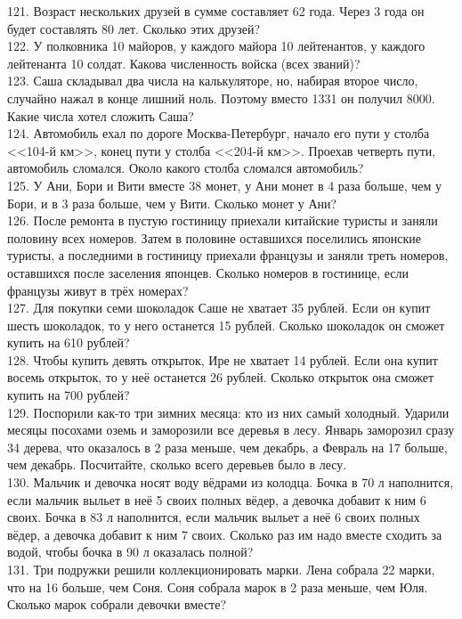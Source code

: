 \documentclass[12pt]{article}
\begin{document}
121. Возраст нескольких друзей в сумме составляет 62 года. Через 3 года он будет составлять 80 лет. Сколько этих друзей?\\
122. У полковника 10 майоров, у каждого майора 10 лейтенантов, у каждого лейтенанта 10 солдат. Какова численность войска (всех званий)?\\
123. Саша складывал два числа на калькуляторе, но, набирая второе число, случайно нажал в конце лишний ноль. Поэтому вместо 1331 он получил 8000. Какие числа хотел сложить Саша?\\
124. Автомобиль ехал по дороге Москва-Петербург, начало его пути у столба <<104-й км>>, конец пути у столба <<204-й км>>. Проехав четверть пути, автомобиль сломался. Около какого столба сломался автомобиль?\\
125. У Ани, Бори и Вити вместе 38 монет, у Ани монет в 4 раза больше, чем у Бори, и в 3 раза больше, чем у Вити. Сколько монет у Ани?\\
126. После ремонта в пустую гостиницу приехали китайские туристы и заняли половину всех номеров. Затем в половине оставшихся поселились японские туристы, а последними в гостиницу приехали французы и заняли треть номеров, оставшихся после заселения японцев. Сколько номеров в гостинице, если французы живут в трёх номерах?\\
127. Для покупки семи шоколадок Саше не хватает 35 рублей. Если он купит шесть шоколадок, то у него останется 15 рублей. Сколько шоколадок он сможет купить на 610 рублей?\\
128. Чтобы купить девять открыток, Ире не хватает 14 рублей. Если она купит восемь открыток, то у неё останется 26 рублей. Сколько открыток она сможет купить на 700 рублей?\\
129. Поспорили как-то три зимних месяца: кто из них самый холодный. Ударили месяцы посохами оземь и заморозили все деревья в лесу. Январь заморозил сразу 34 дерева, что оказалось в 2 раза меньше, чем декабрь, а Февраль на 17 больше, чем декабрь. Посчитайте, сколько всего деревьев было в лесу.\\
130. Мальчик и девочка носят воду вёдрами из колодца. Бочка в 70 л наполнится, если мальчик выльет в неё 5 своих полных вёдер, а девочка добавит к ним 6 своих.
Бочка в 83 л наполнится, если мальчик выльет а неё 6 своих полных вёдер, а девочка добавит к ним 7 своих. Сколько раз им надо вместе сходить за водой, чтобы бочка в 90 л оказалась полной?\\
131. Три подружки решили коллекционировать марки. Лена собрала 22 марки, что на 16 больше, чем Соня. Соня собрала марок в 2 раза меньше, чем Юля. Сколько марок собрали девочки вместе?\\
\end{document}
